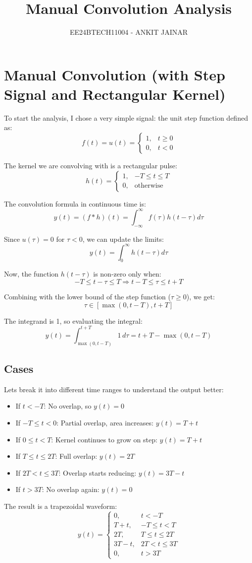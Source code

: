 \documentclass[journal]{IEEEtran}
\begin{document}

\vspace{3cm}

\title{Manual Convolution Analysis}
\author{EE24BTECH11004 - ANKIT JAINAR}
\maketitle

\section{Manual Convolution (with Step Signal and Rectangular Kernel)}

To start the analysis, I chose a very simple signal: the unit step function defined as:
\[
f(t) = u(t) = 
\begin{cases}
1, & t \geq 0 \\
0, & t < 0
\end{cases}
\]

The kernel we are convolving with is a rectangular pulse:
\[
h(t) =
\begin{cases}
1, & -T \leq t \leq T \\
0, & \text{otherwise}
\end{cases}
\]

The convolution formula in continuous time is:
\[
y(t) = (f * h)(t) = \int_{-\infty}^{\infty} f(\tau) h(t - \tau) d\tau
\]

Since $u(\tau) = 0$ for $\tau < 0$, we can update the limits:
\[
y(t) = \int_{0}^{\infty} h(t - \tau) d\tau
\]

Now, the function $h(t - \tau)$ is non-zero only when:
\[
-T \leq t - \tau \leq T \Rightarrow t - T \leq \tau \leq t + T
\]

Combining with the lower bound of the step function ($\tau \geq 0$), we get:
\[
\tau \in [\max(0, t - T), t + T]
\]

The integrand is 1, so evaluating the integral:
\[
y(t) = \int_{\max(0, t - T)}^{t + T} 1 \, d\tau = t + T - \max(0, t - T)
\]

\subsection{Cases}

Lets break it into different time ranges to understand the output better:

\begin{itemize}
    \item If $t < -T$: No overlap, so $y(t) = 0$
    \item If $-T \leq t < 0$: Partial overlap, area increases: $y(t) = T + t$
    \item If $0 \leq t < T$: Kernel continues to grow on step: $y(t) = T + t$
    \item If $T \leq t \leq 2T$: Full overlap: $y(t) = 2T$
    \item If $2T < t \leq 3T$: Overlap starts reducing: $y(t) = 3T - t$
    \item If $t > 3T$: No overlap again: $y(t) = 0$
\end{itemize}

The result is a trapezoidal waveform:
\[
y(t) =
\begin{cases}
0, & t < -T \\
T + t, & -T \leq t < T \\
2T, & T \leq t \leq 2T \\
3T - t, & 2T < t \leq 3T \\
0, & t > 3T
\end{cases}
\]
\end{document}
